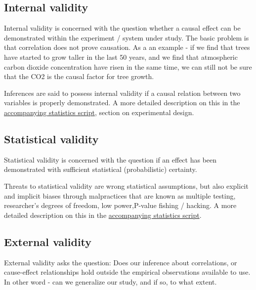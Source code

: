 \documentclass{tufte-book}
\begin{document}

\subsection{Internal validity}

Internal validity is concerned with the question whether a causal effect can be demonstrated within the experiment / system under study. The basic problem is that correlation does not prove causation. As a an example - if we find that trees have started to grow taller in the last 50 years, and we find that atmospheric carbon dioxide concentration have risen in the same time, we can still not be sure that the CO2 is the causal factor for tree growth. 

Inferences are said to possess internal validity if a causal relation between two variables is properly demonstrated. A more detailed description on this in the \href{https://github.com/florianhartig/ResearchSkills/raw/master/Labs/Statistics/Script/EssentialStatistics.pdf}{accompanying statistics script}, section on experimental design.


\subsection{Statistical validity}

Statistical validity is concerned with the question if an effect has been demonstrated with sufficient statistical (probabilistic) certainty. 

Threats to statistical validity are wrong statistical assumptions, but also explicit and implicit biases through malpractices that are known as multiple testing, researcher’s degrees of freedom, low power,P-value fishing / hacking. A more detailed description on this in the \href{https://github.com/florianhartig/ResearchSkills/raw/master/Labs/Statistics/Script/EssentialStatistics.pdf}{accompanying statistics script}. 

\subsection{External validity}

External validity asks the question: Does our inference about correlations, or cause-effect relationships hold outside the empirical observations available to use. In other word - can we generalize our study, and if so, to what extent. 
\end{document}
